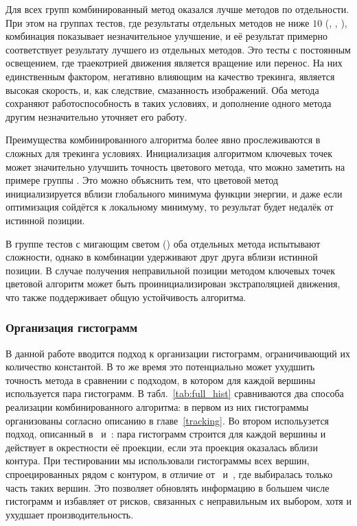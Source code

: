 
Для всех групп комбинированный метод оказался лучше методов по отдельности.
При этом на группах тестов, где результаты отдельных методов не ниже $10$
(, , ), комбинация показывает незначительное улучшение, и её результат
примерно соответствует результату лучшего из отдельных методов.
Это тесты с постоянным освещением, где траекотрией движения является вращение
или перенос.
На них единственным фактором, негативно влияющим на качество трекинга, является
высокая скорость, и, как следствие, смазанность изображений.
Оба метода сохраняют работоспособность в таких условиях, и дополнение одного
метода другим незначительно уточняет его работу.

Преимущества комбинированного алгоритма более явно прослеживаются в сложных для
трекинга условиях.
Инициализация алгоритмом ключевых точек может значительно улучшить точность
цветового метода, что можно заметить на примере группы .
Это можно объяснить тем, что цветовой метод инициализируется вблизи глобального
минимума функции энергии, и даже если оптимизация сойдётся к локальному
минимуму, то результат будет недалёк от истинной позиции.

В группе тестов с мигающим светом () оба отдельных метода
испытывают сложности, однако в комбинации удерживают друг друга вблизи истинной
позиции.
В случае получения неправильной позиции методом ключевых точек цветовой
алгоритм может быть проинициализирован экстраполяцией движения, что также
поддерживает общую устойчивость алгоритма.



\subsubsection{Организация гистограмм}

В данной работе вводится подход к организации гистограмм, ограничивающий их количество константой.
В то же время это потенциально может ухудшить точность метода в сравнении с подходом, в котором для каждой вершины используется пара гистограмм.
В табл.~\ref{tab:full_hist} сравниваются два способа реализации комбинированного алгоритма: в первом из них гистограммы организованы согласно описанию в главе~\ref{tracking}.
Во втором испольузется подход, описанный в~\cite{Tjaden2017} и~\cite{Tjaden2018}: пара гистограмм строится для каждой вершины и действует в окрестности её проекции, если эта проекция оказалась вблизи контура.
При тестировании мы использовали гистограммы всех вершин, спроецированных рядом с контуром, в отличие от~\cite{Tjaden2017} и~\cite{Tjaden2018}, где выбиралась только часть таких вершин.
Это позволяет обновлять информацию в большем числе гистограмм и избавляет от рисков, связанных с неправильным их выбором, хотя и ухудшает производительность.

